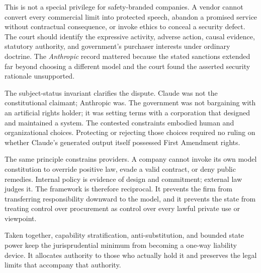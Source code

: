 This is not a special privilege for safety-branded companies. A vendor cannot convert every commercial limit into protected speech, abandon a promised service without contractual consequence, or invoke ethics to conceal a security defect. The court should identify the expressive activity, adverse action, causal evidence, statutory authority, and government's purchaser interests under ordinary doctrine. The \emph{Anthropic} record mattered because the stated sanctions extended far beyond choosing a different model and the court found the asserted security rationale unsupported.

The subject-status invariant clarifies the dispute. Claude was not the constitutional claimant; Anthropic was. The government was not bargaining with an artificial rights holder; it was setting terms with a corporation that designed and maintained a system. The contested constraints embodied human and organizational choices. Protecting or rejecting those choices required no ruling on whether Claude's generated output itself possessed First Amendment rights.

The same principle constrains providers. A company cannot invoke its own model constitution to override positive law, evade a valid contract, or deny public remedies. Internal policy is evidence of design and commitment; external law judges it. The framework is therefore reciprocal. It prevents the firm from transferring responsibility downward to the model, and it prevents the state from treating control over procurement as control over every lawful private use or viewpoint.

Taken together, capability stratification, anti-substitution, and bounded state power keep the jurisprudential minimum from becoming a one-way liability device. It allocates authority to those who actually hold it and preserves the legal limits that accompany that authority.
